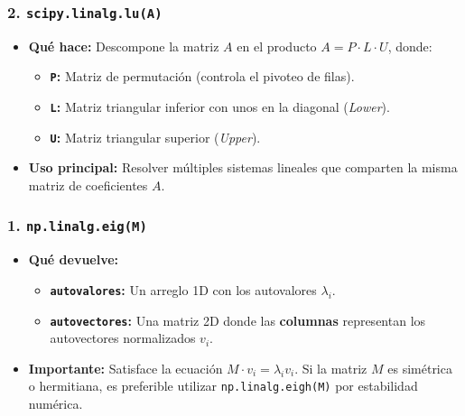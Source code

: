 \documentclass[12pt]{article}
\begin{document}
\begin{cajaflex}
\subsubsection*{\textcolor{teal!70!black}{2. \texttt{scipy.linalg.lu(A)}}}
\begin{itemize}
    \item \textbf{Qué hace:} Descompone la matriz $A$ en el producto $A = P \cdot L \cdot U$, donde:
    \begin{itemize}
        \item \textbf{\texttt{P}:} Matriz de permutación (controla el pivoteo de filas).
        \item \textbf{\texttt{L}:} Matriz triangular inferior con unos en la diagonal (\textit{Lower}).
        \item \textbf{\texttt{U}:} Matriz triangular superior (\textit{Upper}).
    \end{itemize}
    \item \textbf{Uso principal:} Resolver múltiples sistemas lineales que comparten la misma matriz de coeficientes $A$.
\end{itemize}

\subsubsection*{\textcolor{teal!70!black}{1. \texttt{np.linalg.eig(M)}}}
\begin{itemize}
    \item \textbf{Qué devuelve:}
    \begin{itemize}
        \item \textbf{\texttt{autovalores}:} Un arreglo 1D con los autovalores $\lambda_i$.
        \item \textbf{\texttt{autovectores}:} Una matriz 2D donde las \textbf{columnas} representan los autovectores normalizados $v_i$.
    \end{itemize}
    \item \textbf{Importante:} Satisface la ecuación $M \cdot v_i = \lambda_i v_i$. Si la matriz $M$ es simétrica o hermitiana, es preferible utilizar \texttt{np.linalg.eigh(M)} por estabilidad numérica.
\end{itemize}


\end{cajaflex}
\end{document}
